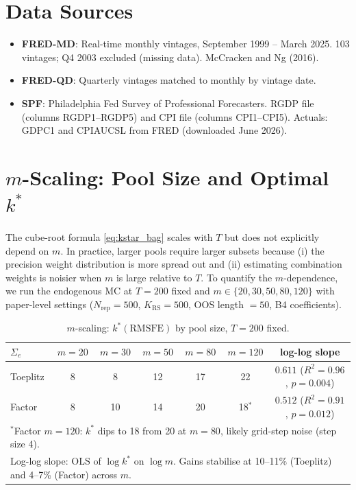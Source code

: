\documentclass[12pt,a4paper]{article}
\begin{document}
\appendix

\section{Data Sources}
\begin{itemize}
\item \textbf{FRED-MD}: Real-time monthly vintages, September 1999 -- March
  2025. 103 vintages; Q4 2003 excluded (missing data). McCracken and Ng (2016).
\item \textbf{FRED-QD}: Quarterly vintages matched to monthly by vintage date.
\item \textbf{SPF}: Philadelphia Fed Survey of Professional Forecasters.
  RGDP file (columns RGDP1--RGDP5) and CPI file (columns CPI1--CPI5).
  Actuals: GDPC1 and CPIAUCSL from FRED (downloaded June 2026).
\end{itemize}

\section{$m$-Scaling: Pool Size and Optimal $k^*$}
\label{app:mscaling}

The cube-root formula \eqref{eq:kstar_bag} scales with $T$ but does not
explicitly depend on $m$. In practice, larger pools require larger
subsets because (i) the precision weight distribution is more spread out
and (ii) estimating combination weights is noisier when $m$ is large
relative to $T$. To quantify the $m$-dependence, we run the endogenous MC
at $T=200$ fixed and $m \in \{20, 30, 50, 80, 120\}$ with paper-level
settings ($N_{\mathrm{rep}}=500$, $K_{\mathrm{RS}}=500$, OOS length $=50$,
B4 coefficients).

\begin{table}[h]
\centering
\caption{$m$-scaling: $k^*(\mathrm{RMSFE})$ by pool size, $T=200$ fixed.}
\label{tab:m_scaling}
\begin{tabular}{lcccccc}
\toprule
$\Sigma_e$ & $m=20$ & $m=30$ & $m=50$ & $m=80$ & $m=120$ & log-log slope \\
\midrule
Toeplitz  & 8 & 8 & 12 & 17 & 22 & $0.611$ ($R^2=0.96$, $p=0.004$) \\
Factor    & 8 & 10 & 14 & 20 & 18$^*$ & $0.512$ ($R^2=0.91$, $p=0.012$) \\
\bottomrule
\multicolumn{7}{l}{\footnotesize $^*$Factor $m=120$: $k^*$ dips to 18 from 20 at $m=80$,
  likely grid-step noise (step size 4).}\\
\multicolumn{7}{l}{\footnotesize Log-log slope: OLS of $\log k^*$ on $\log m$.
  Gains stabilise at 10--11\% (Toeplitz) and 4--7\% (Factor) across $m$.}
\end{tabular}
\end{table}
\end{document}
